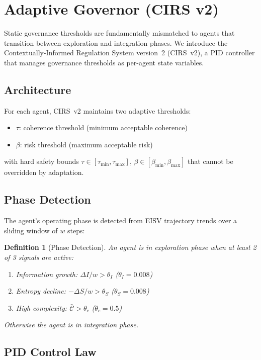 \documentclass[11pt,twocolumn]{article}
\newtheorem{definition}[theorem]{Definition}
\begin{document}
\section{Adaptive Governor (CIRS v2)}
\label{sec:governor}

Static governance thresholds are fundamentally mismatched to agents
that transition between exploration and integration phases. We
introduce the Contextually-Informed Regulation System version~2
(CIRS~v2), a PID controller that manages governance thresholds as
per-agent state variables.

\subsection{Architecture}

For each agent, CIRS~v2 maintains two adaptive thresholds:
\begin{itemize}
\item $\tau$: coherence threshold (minimum acceptable coherence)
\item $\beta$: risk threshold (maximum acceptable risk)
\end{itemize}
with hard safety bounds $\tau \in [\tau_{\min}, \tau_{\max}]$,
$\beta \in [\beta_{\min}, \beta_{\max}]$ that cannot be overridden
by adaptation.

\subsection{Phase Detection}

The agent's operating phase is detected from EISV trajectory trends
over a sliding window of $w$ steps:

\begin{definition}[Phase Detection]
\label{def:phase}
An agent is in \emph{exploration} phase when at least 2 of 3 signals
are active:
\begin{enumerate}
\item Information growth: $\Delta I / w > \theta_I$ ($\theta_I = 0.008$)
\item Entropy decline: $-\Delta S / w > \theta_S$ ($\theta_S = 0.008$)
\item High complexity: $\bar{\mathcal{C}} > \theta_c$ ($\theta_c = 0.5$)
\end{enumerate}
Otherwise the agent is in \emph{integration} phase.
\end{definition}

\subsection{PID Control Law}
\end{document}
